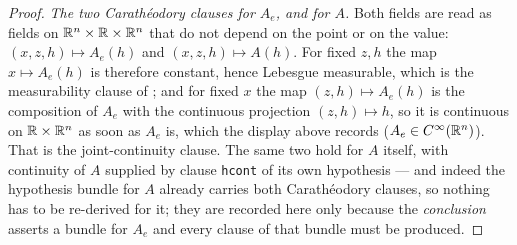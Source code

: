 \begin{proof}
\emph{The two Carath\'eodory clauses for $A_e$, and for $A$.}  Both fields are
read as fields on $\mathbb{R}^n\times\mathbb{R}\times\mathbb{R}^n$ that do not depend on the point or on
the value: $(x,z,h)\mapsto A_e(h)$ and $(x,z,h)\mapsto A(h)$.  For fixed $z,h$
the map $x\mapsto A_e(h)$ is therefore constant, hence Lebesgue measurable,
which is the measurability clause of ; and for
fixed $x$ the map $(z,h)\mapsto A_e(h)$ is the composition of $A_e$ with the
continuous projection $(z,h)\mapsto h$, so it is continuous on $\mathbb{R}\times\mathbb{R}^n$ as
soon as $A_e$ is, which the display above records ($A_e\in C^\infty(\mathbb{R}^n)$).
That is the joint-continuity clause.  The same two hold for $A$ itself, with
continuity of $A$ supplied by clause \texttt{hcont} of its own
 hypothesis --- and indeed the hypothesis bundle
for $A$ already carries both Carath\'eodory clauses, so nothing has to be
re-derived for it; they are recorded here only because the \emph{conclusion}
asserts a  bundle for $A_e$ and every clause of
that bundle must be produced.


\end{proof}
